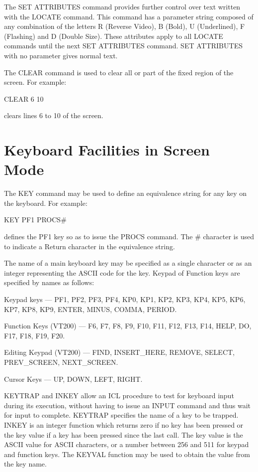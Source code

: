 \documentclass[twoside,11pt,nolof,chapters]{starlink}
\begin{document}
The SET ATTRIBUTES command provides further control over text written with
the LOCATE command. This command has a parameter string composed of any
combination of the letters R (Reverse Video), B (Bold), U (Underlined),
F (Flashing) and D (Double Size). These attributes apply to all LOCATE commands
until the next SET ATTRIBUTES command. SET ATTRIBUTES with no parameter
gives normal text.

The CLEAR command is used to clear all or part of the fixed region of the
screen. For example:
\begin{terminalv}
    CLEAR 6 10
\end{terminalv}
clears lines 6 to 10 of the screen.

\section{Keyboard Facilities in Screen Mode}

The KEY command may be used to define an equivalence string for any key
on the keyboard. For example:
\begin{terminalv}
    KEY  PF1  PROCS#
\end{terminalv}
defines the PF1 key so as to issue the PROCS command. The \# character is
used to indicate a Return character in the equivalence string.

The name of a main keyboard key may be specified as a single character or
as an integer representing the ASCII code for the key. Keypad of Function
keys are specified by names as follows:

Keypad keys --- PF1, PF2, PF3, PF4, KP0, KP1, KP2, KP3, KP4, KP5, KP6, KP7,
KP8, KP9, ENTER, MINUS, COMMA, PERIOD.

Function Keys (VT200) --- F6, F7, F8, F9, F10, F11, F12, F13, F14, HELP,
DO, F17, F18, F19, F20.

Editing Keypad (VT200) --- FIND, INSERT\_HERE, REMOVE, SELECT, PREV\_SCREEN,
NEXT\_SCREEN.

Cursor Keys --- UP, DOWN, LEFT, RIGHT.

KEYTRAP and INKEY allow an ICL procedure to test for keyboard input during
its execution, without having to issue an INPUT command and thus wait for
input to complete. KEYTRAP specifies the name of a key to be trapped. INKEY
is an integer function which returns zero if no key has been pressed or
the key value if a key has been pressed since the last call. The key value
is the ASCII value for ASCII characters, or a number between 256 and 511
for keypad and function keys. The KEYVAL function may be used to obtain
the value from the key name.
\end{document}
